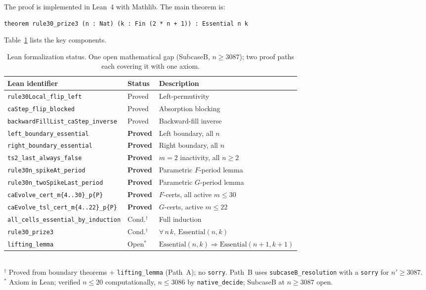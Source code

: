 \documentclass[11pt]{article}
\theoremstyle{plain}
\theoremstyle{definition}
\newcommand{\Essential}{\mathrm{Essential}}
\begin{document}
The proof is implemented in Lean~4 with Mathlib.  The main theorem is:

\begin{lstlisting}
theorem rule30_prize3 (n : Nat) (k : Fin (2 * n + 1)) : Essential n k
\end{lstlisting}

Table~\ref{tab:status} lists the key components.

\begin{table}[h]
\centering
\footnotesize
\begin{tabular}{@{}p{5.5cm}ll@{}}
\toprule
\textbf{Lean identifier} & \textbf{Status} & \textbf{Description} \\
\midrule
\texttt{rule30Local\_flip\_left} & Proved & Left-permutivity \\
\texttt{caStep\_flip\_blocked}   & Proved & Absorption blocking \\
\texttt{backwardFillList\_caStep\_inverse} & Proved & Backward-fill inverse \\
\texttt{left\_boundary\_essential}  & \textbf{Proved} & Left boundary, all $n$ \\
\texttt{right\_boundary\_essential} & \textbf{Proved} & Right boundary, all $n$ \\
\texttt{ts2\_last\_always\_false} & \textbf{Proved} & $m=2$ inactivity, all $n\geq 2$ \\
\texttt{rule30n\_spikeAt\_period} & \textbf{Proved} & Parametric $F$-period lemma \\
\texttt{rule30n\_twoSpikeLast\_period} & \textbf{Proved} & Parametric $G$-period lemma \\
\texttt{caEvolve\_cert\_m\{4..30\}\_p\{P\}} & \textbf{Proved} & $F$-certs, all active $m\leq 30$ \\
\texttt{caEvolve\_tsl\_cert\_m\{4..22\}\_p\{P\}} & \textbf{Proved} & $G$-certs, active $m\leq 22$ \\
\texttt{all\_cells\_essential\_by\_induction} & Cond.$^\dagger$ & Full induction \\
\texttt{rule30\_prize3} & Cond.$^\dagger$ & $\forall\,n\,k,\ \Essential(n,k)$ \\
\midrule
\texttt{lifting\_lemma} & Open$^*$ & $\Essential(n,k) \Rightarrow \Essential(n{+}1,k{+}1)$ \\
\bottomrule
\end{tabular}
\smallskip\\
{\footnotesize $^\dagger$ Proved from boundary theorems $+$ \texttt{lifting\_lemma} (Path~A); no \texttt{sorry}. Path~B uses \texttt{subcaseB\_resolution} with a \texttt{sorry} for $n'\geq 3087$.}\\
{\footnotesize $^*$ Axiom in Lean; verified $n\leq 20$ computationally, $n\leq 3086$ by \texttt{native\_decide}; SubcaseB at $n\geq 3087$ open.}
\caption{Lean formalization status.  One open mathematical gap (SubcaseB, $n \geq 3087$); two proof paths each covering it with one axiom.}
\label{tab:status}
\end{table}
\end{document}
